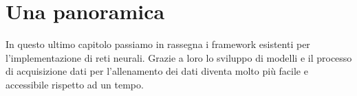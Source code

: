 \section{Una panoramica}
In questo ultimo capitolo passiamo in rassegna i framework esistenti per l'implementazione di reti neurali. Grazie a loro  lo sviluppo di modelli e il processo di acquisizione dati per l'allenamento dei dati diventa molto più facile e accessibile rispetto ad un tempo. 
\begin{figure}[hbtb]
\centering
{} \hspace{1.5cm}
 \hspace{1.5cm}
 \hspace{1.5cm}

\end{figure}
